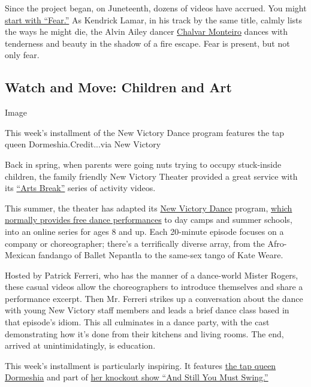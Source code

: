 Since the project began, on Juneteenth, dozens of videos have accrued.
You might \href{https://www.instagram.com/p/CCmnTQMMm_g/}{start with
``Fear.''} As Kendrick Lamar, in his track by the same title, calmly
lists the ways he might die, the Alvin Ailey dancer
\href{https://www.dancemagazine.com/on-the-rise-chalvar-monteiro-2366853607.html}{Chalvar
Monteiro} dances with tenderness and beauty in the shadow of a fire
escape. Fear is present, but not only fear.

\hypertarget{watch-and-move-children-and-art}{%
\subsection{Watch and Move: Children and
Art}\label{watch-and-move-children-and-art}}

Image

This week's installment of the New Victory Dance program features the
tap queen Dormeshia.Credit...via New Victory

Back in spring, when parents were going nuts trying to occupy
stuck-inside children, the family friendly New Victory Theater provided
a great service with its
\href{https://newvictory.org/stories/category/family-engagement/new-victory-arts-break/}{``Arts
Break''} series of activity videos.

This summer, the theater has adapted its
\href{https://newvictory.org/virtual-events/new-victory-dance-2020/}{New
Victory Dance} program,
\href{https://www.nytimes.com/2014/07/31/arts/dance/dancing-and-hoping-to-win-fans-for-life.html?searchResultPosition=2}{which
normally provides free dance performances} to day camps and summer
schools, into an online series for ages 8 and up. Each 20-minute episode
focuses on a company or choreographer; there's a terrifically diverse
array, from the Afro-Mexican fandango of Ballet Nepantla to the same-sex
tango of Kate Weare.

Hosted by Patrick Ferreri, who has the manner of a dance-world Mister
Rogers, these casual videos allow the choreographers to introduce
themselves and share a performance excerpt. Then Mr. Ferreri strikes up
a conversation about the dance with young New Victory staff members and
leads a brief dance class based in that episode's idiom. This all
culminates in a dance party, with the cast demonstrating how it's done
from their kitchens and living rooms. The end, arrived at
unintimidatingly, is education.

This week's installment is particularly inspiring. It features
\href{https://www.nytimes.com/2019/11/22/arts/Dormeshia-tap-dancing.html?searchResultPosition=4}{the
tap queen Dormeshia} and part of
\href{https://www.nytimes.com/2019/12/04/arts/dance/dormeshia-and-still-you-must-swing-review.html?searchResultPosition=3}{her
knockout show ``And Still You Must Swing.''}

